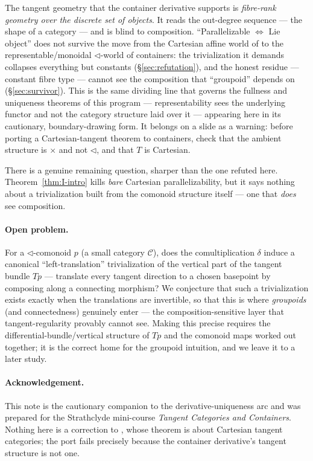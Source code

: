 \documentclass[11pt]{article}
\theoremstyle{definition}
\begin{document}
The tangent geometry that the container derivative supports is \emph{fibre-rank geometry over the
discrete set of objects}. It reads the out-degree sequence --- the shape of a category --- and is
blind to composition. ``Parallelizable $\Leftrightarrow$ Lie object'' does not survive the move
from the Cartesian affine world of \cite{Lanfranchi2026} to the representable/monoidal $\lhd$-world
of containers: the trivialization it demands collapses everything but constants
(\S\ref{sec:refutation}), and the honest residue --- constant fibre type --- cannot see the
composition that ``groupoid'' depends on (\S\ref{sec:survivor}). This is the same dividing line
that governs the fullness and uniqueness theorems of this program --- representability sees the
underlying functor and not the category structure laid over it --- appearing here in its
cautionary, boundary-drawing form. It belongs on a slide as a warning: before porting a
Cartesian-tangent theorem to containers, check that the ambient structure is $\times$ and not
$\lhd$, and that $T$ is Cartesian.

There is a genuine remaining question, sharper than the one refuted here. Theorem~\ref{thm:I-intro}
kills \emph{bare} Cartesian parallelizability, but it says nothing about a trivialization built
from the comonoid structure itself --- one that \emph{does} see composition.

\paragraph{Open problem.} For a $\lhd$-comonoid $p$ (a small category $\mathcal C$), does the
comultiplication $\delta$ induce a canonical ``left-translation'' trivialization of the vertical
part of the tangent bundle $Tp$ --- translate every tangent direction to a chosen basepoint by
composing along a connecting morphism? We conjecture that such a trivialization exists exactly when
the translations are invertible, so that this is where \emph{groupoids} (and connectedness)
genuinely enter --- the composition-sensitive layer that tangent-regularity provably cannot see.
Making this precise requires the differential-bundle/vertical structure of $Tp$ and the comonoid
maps worked out together; it is the correct home for the groupoid intuition, and we leave it to a
later study.

\paragraph{Acknowledgement.} This note is the cautionary companion to the derivative-uniqueness arc
and was prepared for the Strathclyde mini-course \emph{Tangent Categories and Containers}. Nothing
here is a correction to \cite{Lanfranchi2026}, whose theorem is about Cartesian tangent categories;
the port fails precisely because the container derivative's tangent structure is not one.
\end{document}
